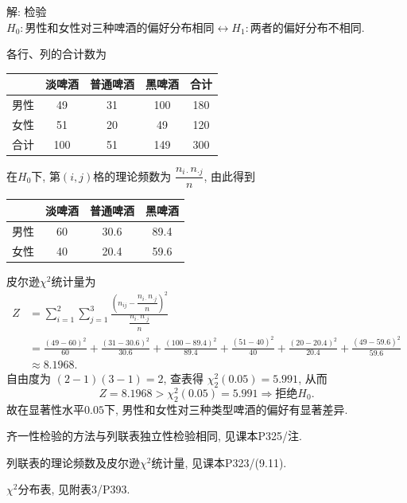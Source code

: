 \documentclass[standard]{ExBook}
\begin{document}
\begin{qitems}
\vspace{\dimexpr2.5cm-5em\relax}

解: 检验
$
H_0:\text{男性和女性对三种啤酒的偏好分布相同}
\leftrightarrow
H_1:\text{两者的偏好分布不相同}.
$

各行、列的合计数为
\begin{center}
\setlength{\tabcolsep}{30pt}
\begin{tabular}{c|ccc|c}
\hline
 & 淡啤酒 & 普通啤酒 & 黑啤酒 & 合计\\
\hline
男性 & 49 & 31 & 100 & 180\\
女性 & 51 & 20 & 49 & 120\\
\hline
合计 & 100 & 51 & 149 & 300\\
\hline
\end{tabular}
\end{center}
在$H_0$下, 第$(i,j)$格的理论频数为
$
\dfrac{n_{i\cdot}n_{\cdot j}}{n}
$,
由此得到
\begin{center}
\setlength{\tabcolsep}{35pt}
\begin{tabular}{c|ccc}
\hline
 & 淡啤酒 & 普通啤酒 & 黑啤酒\\
\hline
男性 & 60 & 30.6 & 89.4\\
女性 & 40 & 20.4 & 59.6\\
\hline
\end{tabular}
\end{center}
皮尔逊$\chi^2$统计量为
$$
\begin{aligned}
Z
&=\sum_{i=1}^{2}\sum_{j=1}^{3}
\frac{\left(n_{ij}-\dfrac{n_{i\cdot}n_{\cdot j}}{n}\right)^2}
{\dfrac{n_{i\cdot}n_{\cdot j}}{n}}\\
&=\frac{(49-60)^2}{60}
+\frac{(31-30.6)^2}{30.6}
+\frac{(100-89.4)^2}{89.4}
+\frac{(51-40)^2}{40}
+\frac{(20-20.4)^2}{20.4}
+\frac{(49-59.6)^2}{59.6}\\
&\approx8.1968.
\end{aligned}
$$
自由度为
$
(2-1)(3-1)=2
$,
查表得
$
\chi_2^2(0.05)=5.991
$,
从而
$$
Z=8.1968>\chi_2^2(0.05)=5.991
\Longrightarrow
\text{拒绝}H_0.
$$
故在显著性水平$0.05$下, 男性和女性对三种类型啤酒的偏好有显著差异.

\textcolor{themeColor}{\selectfont {} 齐一性检验的方法与列联表独立性检验相同, 见课本P325/注.}

\textcolor{themeColor}{\selectfont {} 列联表的理论频数及皮尔逊$\chi^2$统计量, 见课本P323/(9.11).}

\textcolor{themeColor}{\selectfont {} $\chi^2$分布表, 见附表3/P393.}

\vspace{2.5cm-5em}


\end{qitems}
\end{document}
